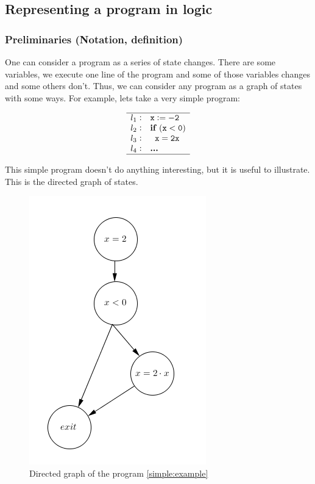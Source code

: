 \subsection{Representing a program in logic}

\subsubsection{Preliminaries (Notation, definition)}

One can consider a program as a series of state changes. There are some variables, we execute one line of the program and some of those variables changes and some others don't. Thus, we can consider any program as a graph of states with some ways. For example, lets take a very simple program:

\[
	\begin{array}{l@{\hspace{0.3em}}c@{\hspace{1em}}l}
	\hline
		l_1 & : & \mathtt{x := -2} \\
		l_2 & : & \mathtt{\textbf{if } (x<0)} \\
		l_3 & : & \mathtt{\;\;x = 2x} \\
		l_4 & : & \mathtt{\textbf{...}}\\
	\hline
	\end{array}
\]
\label{simple:example}

This simple program doesn't do anything interesting, but it is useful to illustrate. This is the directed graph of states.

\begin{figure}[hbtp]
\centering
\includegraphics[scale=0.6]{graphics/simpleExample.png}
\caption{Directed graph of the program \ref{simple:example}}
\end{figure}


